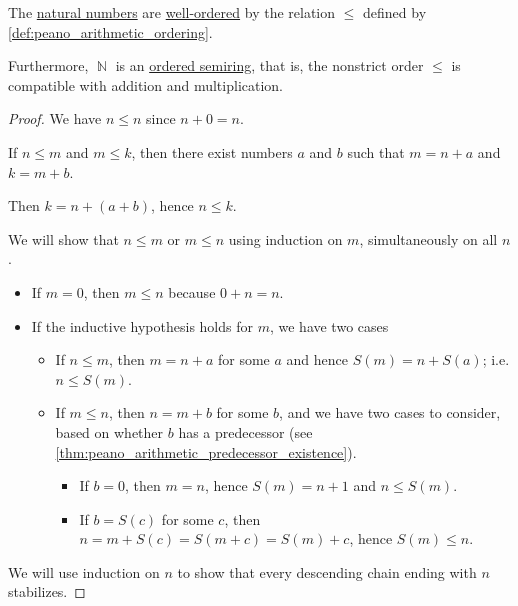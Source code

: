 \begin{proposition}\label{thm:natural_numbers_are_well_ordered}
  The \hyperref[def:natural_numbers]{natural numbers} are \hyperref[def:well_ordered_set]{well-ordered} by the relation \( \leq \) defined by \cref{def:peano_arithmetic_ordering}.

  Furthermore, \( \BbbN \) is an \hyperref[def:ordered_semiring]{ordered semiring}, that is, the nonstrict order \( \leq \) is compatible with addition and multiplication.
\end{proposition}
\begin{proof}
   We have \( n \leq n \) since \( n + 0 = n \).

   If \( n \leq m \) and \( m \leq k \), then there exist numbers \( a \) and \( b \) such that \( m = n + a \) and \( k = m + b \).

  Then \( k = n + (a + b) \), hence \( n \leq k \).

   We will show that \( n \leq m \) or \( m \leq n \) using induction on \( m \), simultaneously on all \( n \).
  \begin{itemize}
    \item If \( m = 0 \), then \( m \leq n \) because \( 0 + n = n \).
    \item If the inductive hypothesis holds for \( m \), we have two cases
    \begin{itemize}
      \item If \( n \leq m \), then \( m = n + a \) for some \( a \) and hence \( S(m) = n + S(a) \); i.e. \( n \leq S(m) \).
      \item If \( m \leq n \), then \( n = m + b \) for some \( b \), and we have two cases to consider, based on whether \( b \) has a predecessor (see \cref{thm:peano_arithmetic_predecessor_existence}).
      \begin{itemize}
        \item If \( b = 0 \), then \( m = n \), hence \( S(m) = n + 1 \) and \( n \leq S(m) \).
        \item If \( b = S(c) \) for some \( c \), then \( n = m + S(c) = S(m + c) = S(m) + c \), hence \( S(m) \leq n \).
      \end{itemize}
    \end{itemize}
  \end{itemize}

   We will use induction on \( n \) to show that every descending chain ending with \( n \) stabilizes.


\end{proof}
